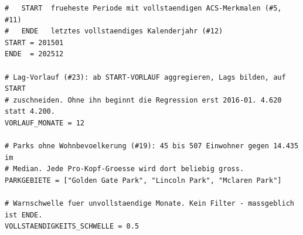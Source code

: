 %
%




\begin{lstlisting}[style=pythonstil,
  label={lst:konstanten},
  caption={Zeitraum und Ausschlüsse als benannte Konstanten
           (\texttt{prep/config.py}, Z.~83--97)}]
#   START  frueheste Periode mit vollstaendigen ACS-Merkmalen (#5, #11)
#   ENDE   letztes vollstaendiges Kalenderjahr (#12)
START = 201501
ENDE  = 202512

# Lag-Vorlauf (#23): ab START-VORLAUF aggregieren, Lags bilden, auf START
# zuschneiden. Ohne ihn beginnt die Regression erst 2016-01. 4.620 statt 4.200.
VORLAUF_MONATE = 12

# Parks ohne Wohnbevoelkerung (#19): 45 bis 507 Einwohner gegen 14.435 im
# Median. Jede Pro-Kopf-Groesse wird dort beliebig gross.
PARKGEBIETE = ["Golden Gate Park", "Lincoln Park", "Mclaren Park"]

# Warnschwelle fuer unvollstaendige Monate. Kein Filter - massgeblich ist ENDE.
VOLLSTAENDIGKEITS_SCHWELLE = 0.5
\end{lstlisting}


